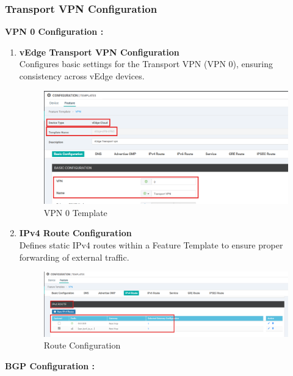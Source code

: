 \documentclass[12pt,english]{report}
\begin{document}
\subsubsection{Transport VPN Configuration}
\textbf{VPN 0 Configuration :}
\begin{enumerate}
    \item \textbf{vEdge Transport VPN Configuration} \\
    Configures basic settings for the Transport VPN (VPN 0), ensuring consistency across vEdge devices.
\begin{figure}[H]
    \centering
    \includegraphics[width= 1 \textwidth]{chapitre 3/template/2.png}
    \caption{VPN 0 Template}
    \label{VPN 0 Template}
\end{figure}  
    \item \textbf{IPv4 Route Configuration} \\
    Defines static IPv4 routes within a Feature Template to ensure proper forwarding of external traffic.
\begin{figure}[H]
    \centering
    \includegraphics[width= 1 \textwidth]{chapitre 3/template/2.5.png}
    \caption{Route Configuration}
    \label{Route Configuration}
\end{figure}
\end{enumerate}
\textbf{BGP Configuration :}
\end{document}
